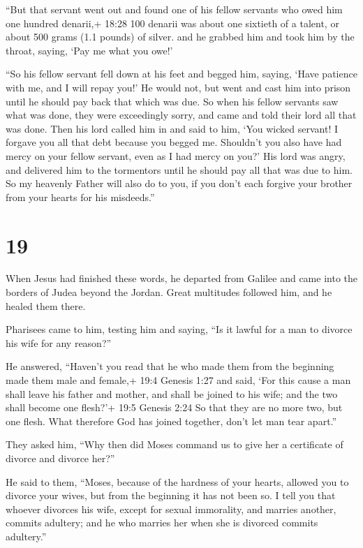  ``But that servant went out and found one of his fellow
servants who owed him one hundred denarii,+ 18:28 100 denarii was about
one sixtieth of a talent, or about 500 grams (1.1 pounds) of silver. and
he grabbed him and took him by the throat, saying, `Pay me what you
owe!'

 ``So his fellow servant fell down at his feet and begged
him, saying, `Have patience with me, and I will repay you!'
 He would not, but went and cast him into prison until he
should pay back that which was due.  So when his fellow
servants saw what was done, they were exceedingly sorry, and came and
told their lord all that was done.  Then his lord called
him in and said to him, `You wicked servant! I forgave you all that debt
because you begged me.  Shouldn't you also have had mercy
on your fellow servant, even as I had mercy on you?'  His
lord was angry, and delivered him to the tormentors until he should pay
all that was due to him.  So my heavenly Father will also
do to you, if you don't each forgive your brother from your hearts for
his misdeeds.''

\hypertarget{section-18}{%
\section{19}\label{section-18}}

 When Jesus had finished these words, he departed from
Galilee and came into the borders of Judea beyond the Jordan.
 Great multitudes followed him, and he healed them there.

 Pharisees came to him, testing him and saying, ``Is it
lawful for a man to divorce his wife for any reason?''

 He answered, ``Haven't you read that he who made them from
the beginning made them male and female,+ 19:4 Genesis 1:27 
and said, `For this cause a man shall leave his father and mother, and
shall be joined to his wife; and the two shall become one flesh?'+ 19:5
Genesis 2:24  So that they are no more two, but one flesh.
What therefore God has joined together, don't let man tear apart.''

 They asked him, ``Why then did Moses command us to give her
a certificate of divorce and divorce her?''

 He said to them, ``Moses, because of the hardness of your
hearts, allowed you to divorce your wives, but from the beginning it has
not been so.  I tell you that whoever divorces his wife,
except for sexual immorality, and marries another, commits adultery; and
he who marries her when she is divorced commits adultery.''

